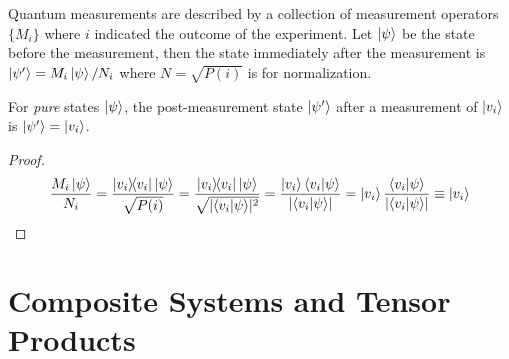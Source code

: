 		\begin{postulate}
			Quantum measurements are described by a collection of measurement operators \( \{ M_i \} \) where \(i\) indicated the outcome of the experiment. Let \(\ket{\psi}\) be the state before the measurement, then the state immediately after the measurement is \( \ket{\psi'} = M_i \ket{\psi} / N_i \) where \( N = \sqrt{P(i)} \) is for normalization.
		\end{postulate}

		\begin{theorem}
			For \emph{pure} states \(\ket{\psi}\), the post-measurement state \(\ket{\psi'}\) after a measurement of \(\ket{v_i}\) is \(\ket{\psi'} = \ket{v_i}\).
		\end{theorem}
		\begin{proof}
			\begin{equation}
				\frac{M_i \ket{\psi}}{N_i}
					= \frac{\op{v_i}{v_i} \ket{\psi}}{\sqrt{P(i)}}
					= \frac{\op{v_i}{v_i} \ket{\psi}}{\sqrt{\lvert \ip{v_i}{\psi} \rvert^2}}
					= \frac{\ket{v_i} \ip{v_i}{\psi}}{\lvert \ip{v_i}{\psi} \rvert}
					= \ket{v_i} \frac{\ip{v_i}{\psi}}{\lvert \ip{v_i}{\psi} \rvert}
					\equiv \ket{v_i}
			\end{equation}
		\end{proof}

	\section{Composite Systems and Tensor Products}
		\label{sec:composite}

